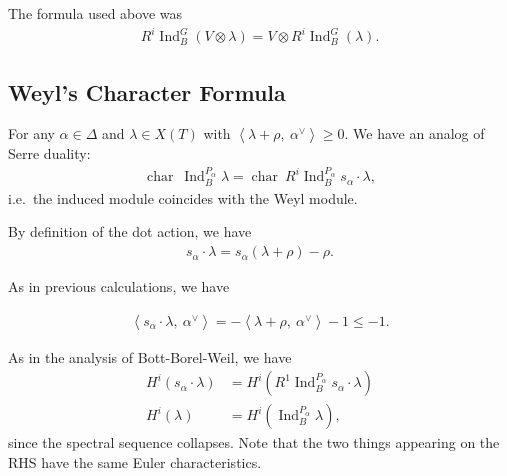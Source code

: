 \begin{remark}

\begin{remark}

The formula used above was
\begin{align*}   R^i \operatorname{Ind}_B^G (V\otimes\lambda) = V\otimes R^i \operatorname{Ind}_B^G(\lambda) .\end{align*}

\end{remark}

\end{remark}

\hypertarget{weyls-character-formula-1}{%
\subsection{Weyl's Character Formula}\label{weyls-character-formula-1}}

For any \(\alpha\in\Delta\) and \(\lambda \in X(T)\) with
\({\left\langle {\lambda + \rho},~{\alpha^\vee} \right\rangle} \geq 0\).
We have an analog of Serre duality:
\begin{align*}   \operatorname{char}~\operatorname{Ind}_B^{P_\alpha} \lambda = \operatorname{char}~R^i \operatorname{Ind}_B^{P_\alpha} s_\alpha \cdot \lambda ,\end{align*}
i.e.~the induced module coincides with the Weyl module.

By definition of the dot action, we have
\begin{align*}   s_\alpha \cdot \lambda = s_\alpha(\lambda + \rho) - \rho .\end{align*}

As in previous calculations, we have

\begin{align*}   {\left\langle {s_\alpha\cdot\lambda},~{\alpha^\vee} \right\rangle} = -{\left\langle {\lambda+\rho},~{\alpha^\vee} \right\rangle} - 1 \leq - 1 .\end{align*}

As in the analysis of Bott-Borel-Weil, we have
\begin{align*}   H^i(s_\alpha \cdot\lambda) &= H^i( R^1 \operatorname{Ind}_B^{P_\alpha} s_\alpha\cdot\lambda ) \\ H^i(\lambda) &= H^i( \operatorname{Ind}_B^{P_\alpha}\lambda ) ,\end{align*}
since the spectral sequence collapses. Note that the two things
appearing on the RHS have the same Euler characteristics.


